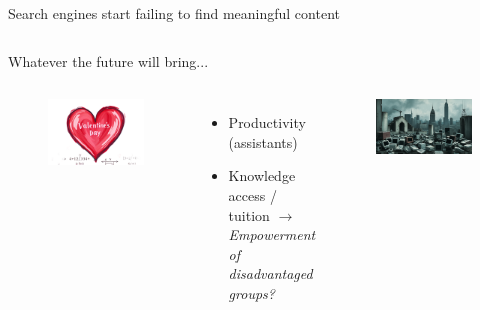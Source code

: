 \documentclass[10pt]{beamer}
\begin{document}
\begin{frame}{Search engines start failing to find meaningful content}
\begin{columns}[T,onlytextwidth]
	\end{columns}
\end{frame}

\begin{frame}[standout]{Whatever the future will bring...}
	\begin{columns}[T,onlytextwidth]
		\normalfont \normalsize
		\hspace*{-0.7cm} 
		\begin{figure}
			\includegraphics[width=\textwidth]{figures/Valentine_s_Day_gift_card_impressionistic_style_VanGogh_style_painting_big_heart.png}
		\end{figure}
		\begin{itemize}
		\item Productivity (assistants)
		\item Knowledge access / tuition  \vspace{0.5cm}\linebreak
		\emph{ $\rightarrow$ Empowerment of disadvantaged groups?}
	\end{itemize}
		\begin{figure}
			\includegraphics[width=\textwidth]{figures/Oil_painting_of_a_city_after_the_war_ruins_many_broken_computers_littered_all_over_broken_screens_an_2371238122.png}

\end{figure}
\end{columns}
\end{frame}
\end{document}
